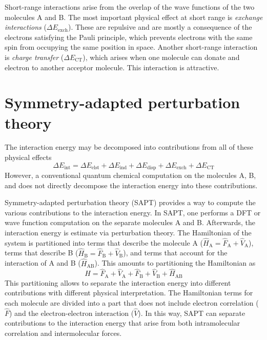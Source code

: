 \documentclass[../Main/notes.tex]{subfiles}
\begin{document}
Short-range interactions arise from the overlap of the wave functions of the two molecules A and B.
The most important physical effect at short range is \emph{exchange interactions} ($\Delta E_\text{exch}$).
These are repulsive and are mostly a consequence of the electrons satisfying the Pauli principle, which prevents electrons with the same spin from occupying the same position in space.
Another short-range interaction is \emph{charge transfer} ($\Delta E_\text{CT}$), which arises when one molecule can donate and electron to another acceptor molecule.
This interaction is attractive.

\section{Symmetry-adapted perturbation theory}

The interaction energy may be decomposed into contributions from all of these physical effects
\begin{equation}
\Delta E_\text{int} = \Delta E_\text{elst} + \Delta E_\text{ind} + \Delta E_\text{disp} + \Delta E_\text{exch}+ \Delta E_\text{CT}
\end{equation}
However, a conventional quantum chemical computation on the molecules A, B, and  does not directly decompose the interaction energy into these contributions.

Symmetry-adapted perturbation theory (SAPT) provides a way to compute the various contributions to the interaction energy.
In SAPT, one performs a DFT or wave function computation on the separate molecules A and B.
Afterwards, the interaction energy is estimate via perturbation theory.
The Hamiltonian of the   system is partitioned into terms that describe the molecule A ($\hat{H}_\mathrm{A} = \hat{F}_\mathrm{A} + \hat{V}_\mathrm{A} $), terms that describe B ($\hat{H}_\mathrm{B} =  \hat{F}_\mathrm{B} + \hat{V}_\mathrm{B}$), and terms that account for the interaction of A and B ($\hat{H}_\mathrm{AB}$).
This amounts to partitioning the Hamiltonian as
\begin{equation}
\hat{H} = \hat{F}_\mathrm{A} + \hat{V}_\mathrm{A} + \hat{F}_\mathrm{B} + \hat{V}_\mathrm{B} + \hat{H}_\mathrm{AB}
\end{equation}
This partitioning allows to separate the interaction energy into different contributions with different physical interpretation.
The Hamiltonian terms for each molecule are divided into a part that does not include electron correlation ($\hat{F}$) and the electron-electron interaction ($\hat{V}$).
In this way, SAPT can separate contributions to the interaction energy that arise from both intramolecular correlation and intermolecular forces.
\end{document}
